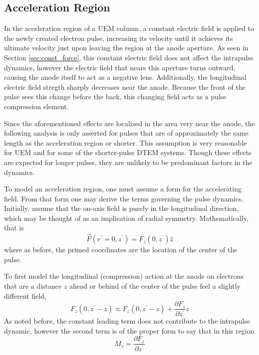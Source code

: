 \subsection{Acceleration Region}

In the acceleration region of a UEM column, a constant electric field is applied to the newly created electron pulse, increasing its velocity until it achieves its ultimate velocity just upon leaving the region at the anode aperture.
As seen in Section \ref{sec:const_force}, this constant electric field does not affect the intrapulse dynamics, however the electric field that nears this aperture turns outward, causing the anode itself to act as a negative lens. %
Additionally, the longitudinal electric field stregth sharply decreases near the anode.
Because the front of the pulse sees this change before the back, this changing field acts as a pulse compression element.

Since the aforementioned effects are localized in the area very near the anode, the following analysis is only asserted for pulses that are of approximately the same length as the acceleration region or shorter.
This assumption is very reasonable for UEM and for some of the shorter-pulse DTEM systems.
Though these effects are expected for longer pulses, they are unlikely to be predominant factors in the dynamics.

To model an acceleration region, one must assume a form for the accelerating field.
From that form one may derive the terms governing the pulse dynamics. Initially, assume that the on-axis field is purely in the longitudinal direction, which may be thought of as an implication of radial symmetry.
Mathematically, that is
\begin{equation}
  \vec{F}(r^{\prime}=0,z^{\prime}) = F_z (0,z^{\prime}) \hat{z}
\end{equation}
where as before, the primed coordinates are the location of the center of the pulse.

To first model the longitudinal (compression) action at the anode %
on electrons that are a distance $z$ ahead or behind of the center of the pulse feel a slightly different field, 
\begin{equation}
  F_z(0,z^{\prime} - z) \approx F_z(0,z^{\prime} - z) + \frac{\partial F_z}{\partial z^{\prime}} z
\end{equation}
As noted before, the constant leading term does not contribute to the intrapulse dynamic, however the second term is of the proper form to say that in this region
\begin{equation}
  M_z = \frac{\partial F_z}{\partial z^{\prime}}
\end{equation}

